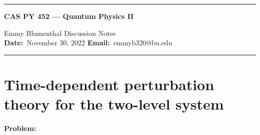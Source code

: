 \documentclass[10pt]{article}
\newcommand{\1}{\mathbf 1}
\begin{document}
\begin{center}
	\hrule
	\vspace{.4cm}
	{\textbf { \large CAS PY 452 --- Quantum Physics II}}
\end{center}
Emmy Blumenthal \hspace{\fill} \hspace{\fill}  \textbf{} Discussion Notes\  \\
\textbf{Date:}\  November 30, 2022   \hspace{\fill} \textbf{Email:}\ emmyb320@bu.edu

\vspace{.4cm}
\hrule

\section*{Time-dependent perturbation theory for the two-level system}

\paragraph{Problem:}
\end{document}
